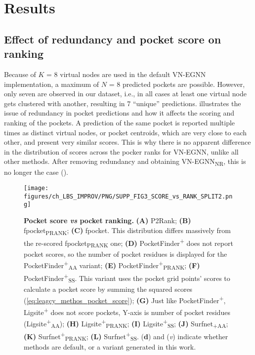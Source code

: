 \section{Results}

\subsection{Effect of redundancy and pocket score on ranking}

Because of $K$ = 8 virtual nodes are used in the default VN-EGNN implementation, a maximum of $N$ = 8 predicted pockets are possible. However, only seven are observed in our dataset, i.e., in all cases at least one virtual node gets clustered with another, resulting in 7 ``unique'' predictions.  illustrates the issue of redundancy in pocket predictions and how it affects the scoring and ranking of the pockets. A prediction of the same pocket is reported multiple times as distinct virtual nodes, or pocket centroids, which are very close to each other, and present very similar scores. This is why there is no apparent difference in the distribution of scores across the pocker ranks for VN-EGNN, unlike all other methods. After removing redundancy and obtaining VN-EGNN\textsubscript{NR}, this is no longer the case ().

\begin{figure}[htb!]
    \centering
    \texttt{[image: figures/ch\_LBS\_IMPROV/PNG/SUPP\_FIG3\_SCORE\_vs\_RANK\_SPLIT2.png]}
    \caption[Pocket score \textit{vs} pocket ranking]{\textbf{Pocket score \textit{vs} pocket ranking.} \textbf{(A)} P2Rank; \textbf{(B)} fpocket\textsubscript{PRANK}; \textbf{(C)} fpocket. This distribution differs massively from the re-scored fpocket\textsubscript{PRANK} one; \textbf{(D)} PocketFinder\textsuperscript{+} does not report pocket scores, so the number of pocket residues is displayed for the PocketFinder\textsuperscript{+}\textsubscript{AA} variant; \textbf{(E)} PocketFinder\textsuperscript{+}\textsubscript{PRANK}; \textbf{(F)} PocketFinder\textsuperscript{+}\textsubscript{SS}. This variant uses the pocket grid points’ scores to calculate a pocket score by summing the squared scores (\autoref{eq:leagcy_methos_pocket_score}); \textbf{(G)} Just like PocketFinder\textsuperscript{+}, Ligsite\textsuperscript{+} does not score pockets, Y-axis is number of pocket residues (Ligsite\textsuperscript{+}\textsubscript{AA}); \textbf{(H)} Ligsite\textsuperscript{+}\textsubscript{PRANK}; \textbf{(I)} Ligsite\textsuperscript{+}\textsubscript{SS}; \textbf{(J)} Surfnet\textsubscript{+}\textsubscript{AA}; \textbf{(K)} Surfnet\textsuperscript{+}\textsubscript{PRANK}; \textbf{(L)} Surfnet\textsuperscript{+}\textsubscript{SS}. (\textbf{d}) and (\textit{v}) indicate whether methods are default, or a variant generated in this work.}
    \label{fig:pocket_score_vs_rank2}
\end{figure}


